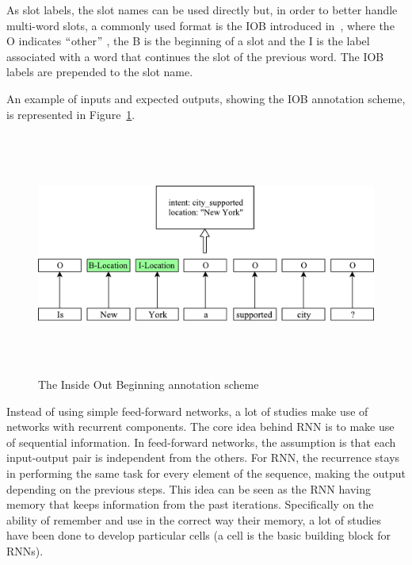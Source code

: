 As slot labels, the slot names can be used directly but, in order to better handle multi-word slots, a commonly used format is the IOB introduced in~\cite{ramshaw1999text}, where the O indicates $``$other$"$ , the B is the beginning of a slot and the I is the label associated with a word that continues the slot of the previous word. The IOB labels are prepended to the slot name.

An example of inputs and expected outputs, showing the IOB annotation scheme, is represented in Figure~\ref{fig:iob}.

\begin{figure}[!htbp]
    \centering
    \includegraphics[max width=\linewidth,max height=8cm,keepaspectratio]{figures/iob}
    \caption{The Inside Out Beginning annotation scheme}\label{fig:iob}
\end{figure}

Instead of using simple feed-forward networks, a lot of studies make use of networks with recurrent components. The core idea behind RNN is to make use of sequential information. In feed-forward networks, the assumption is that each input-output pair is independent from the others. For RNN, the recurrence stays in performing the same task for every element of the sequence, making the output depending on the previous steps. This idea can be seen as the RNN having memory that keeps information from the past iterations. Specifically on the ability of remember and use in the correct way their memory, a lot of studies have been done to develop particular cells (a cell is the basic building block for RNNs).

